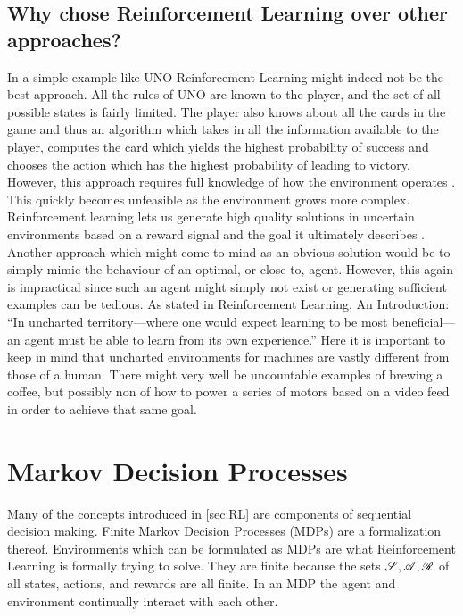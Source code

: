 \subsection*{Why chose Reinforcement Learning over other approaches?}\label{subsec:Why_RL}
In a simple example like UNO Reinforcement Learning might indeed not be the best approach. All the rules of UNO are known to the player, and the set of all possible states is fairly limited. The player also knows about all the cards in the game and thus an algorithm which takes in all the information available to the player, computes the card which yields the highest probability of success and chooses the action which has the highest probability of leading to victory. However, this approach requires full knowledge of how the environment operates \cite[p. 8]{sutton_reinforcement_2018}. This quickly becomes unfeasible as the environment grows more complex. Reinforcement learning lets us generate high quality solutions in uncertain environments based on a reward signal and the goal it ultimately describes \cite[p. 03]{sutton_reinforcement_2018}. Another approach which might come to mind as an obvious solution would be to simply mimic the behaviour of an optimal, or close to, agent. However, this again is impractical since such an agent might simply not exist or generating sufficient examples can be tedious. As stated in Reinforcement Learning, An Introduction: “In uncharted territory—where one would expect learning to be most beneficial—an agent must be able to learn from its own experience.” \cite[p. 02]{sutton_reinforcement_2018} Here it is important to keep in mind that uncharted environments for machines are vastly different from those of a human. There might very well be uncountable examples of brewing a coffee, but possibly non of how to power a series of motors based on a video feed in order to achieve that same goal.

\section{Markov Decision Processes}\label{sec:MDP} %
Many of the concepts introduced in \ref{sec:RL} are components of sequential decision making. Finite Markov Decision Processes (MDPs) are a formalization thereof. Environments which can be formulated as MDPs are what Reinforcement Learning is formally trying to solve. They are finite because the sets $\mathscr{S}, \mathscr{A}, \mathscr{R}$ of all states, actions, and rewards are all finite. In an MDP the agent and environment continually interact with each other. 

